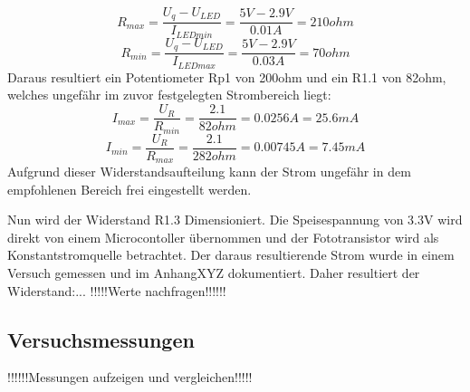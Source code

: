 \documentclass[main.tex]{subfiles} %
\begin{document}
\[
    R_{max} = \frac{U_q - U_{LED}}{I_{LEDmin}} = \frac{5V - 2.9V}{0.01A} = 210ohm
\]
\[
    R_{min} = \frac{U_q - U_{LED}}{I_{LEDmax}} = \frac{5V - 2.9V}{0.03A} = 70ohm
\]
Daraus resultiert ein Potentiometer Rp1 von 200ohm und ein R1.1 von 82ohm, welches ungefähr im zuvor festgelegten
Strombereich liegt:
\[
    I_{max} = \frac{U_R}{R_{min}} = \frac{2.1}{82ohm} = 0.0256A = 25.6mA
\]
\[
    I_{min} = \frac{U_R}{R_{max}} = \frac{2.1}{282ohm} = 0.00745A = 7.45mA
\]
Aufgrund dieser Widerstandsaufteilung kann der Strom ungefähr in dem empfohlenen Bereich frei eingestellt werden.


Nun wird der Widerstand R1.3 Dimensioniert. Die Speisespannung von 3.3V wird direkt von einem Microcontoller übernommen
und der Fototransistor wird als Konstantstromquelle betrachtet. Der daraus resultierende Strom wurde in einem Versuch gemessen
und im AnhangXYZ dokumentiert. Daher resultiert der Widerstand:... !!!!!Werte nachfragen!!!!!!

\subsection{Versuchsmessungen}
!!!!!!Messungen aufzeigen und vergleichen!!!!!

\end{document}
